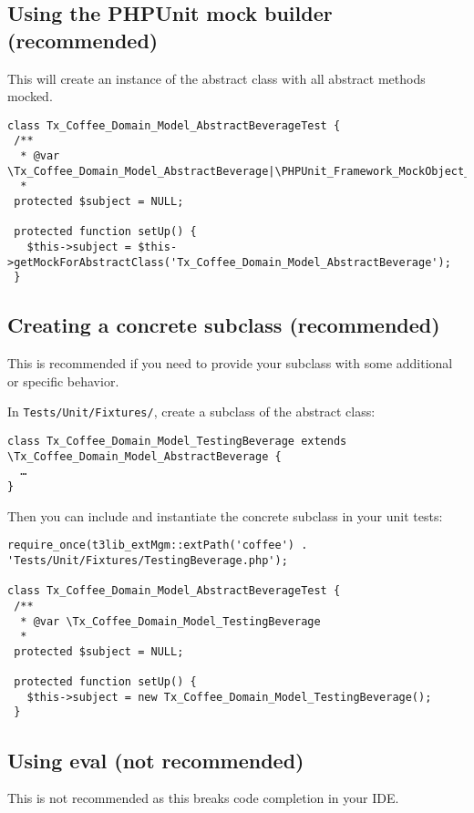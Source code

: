 \documentclass[a4paper,twoside,landscape]{scrartcl}
\begin{document}
\subsection{Using the PHPUnit mock builder (recommended)}

This will create an instance of the abstract class with all abstract methods mocked.

\small
\begin{verbatim}
class Tx_Coffee_Domain_Model_AbstractBeverageTest {
 /**
  * @var \Tx_Coffee_Domain_Model_AbstractBeverage|\PHPUnit_Framework_MockObject_MockObject
  *
 protected $subject = NULL;

 protected function setUp() {
   $this->subject = $this->getMockForAbstractClass('Tx_Coffee_Domain_Model_AbstractBeverage');
 }
\end{verbatim}
\normalsize

\subsection{Creating a concrete subclass (recommended)}
This is recommended if you need to provide your subclass with some additional or specific behavior.

In \texttt{Tests/Unit/Fixtures/}, create a subclass of the abstract class:

\small
\begin{verbatim}
class Tx_Coffee_Domain_Model_TestingBeverage extends \Tx_Coffee_Domain_Model_AbstractBeverage {
  …
}
\end{verbatim}
\normalsize

Then you can include and instantiate the concrete subclass in your unit tests:

\small
\begin{verbatim}
require_once(t3lib_extMgm::extPath('coffee') . 'Tests/Unit/Fixtures/TestingBeverage.php');

class Tx_Coffee_Domain_Model_AbstractBeverageTest {
 /**
  * @var \Tx_Coffee_Domain_Model_TestingBeverage
  *
 protected $subject = NULL;

 protected function setUp() {
   $this->subject = new Tx_Coffee_Domain_Model_TestingBeverage();
 }
\end{verbatim}
\normalsize

\subsection{Using eval (not recommended)}
This is not recommended as this breaks code completion in your IDE.
\end{document}
